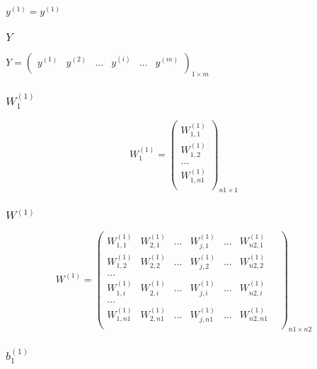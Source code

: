 \documentclass[
]{article}
\begin{document}
\(y^{(1)}={y^{(1)}}\)

\hypertarget{header-n9}{%
\subsubsection{\texorpdfstring{\(Y\)}{Y}}\label{header-n9}}

\(Y={
    \begin{pmatrix}
      y^{(1)} & y^{(2)} &...& y^{(i)} &...& y^{(m)} \\
    \end{pmatrix}
  }_{1×m}\)

\hypertarget{header-n11}{%
\subsubsection{\texorpdfstring{\(W^{(1)}_{1}\)}{W\^{}\{(1)\}\_\{1\}}}\label{header-n11}}

\[W^{(1)}_{1} = {
    \begin{pmatrix}
     W^{(1)}_{1,1} \\
     W^{(1)}_{1,2} \\
     ...\\
     W^{(1)}_{1,n1} \\
    \end{pmatrix}
  }_{n1×1}\]

\hypertarget{header-n13}{%
\subsubsection{\texorpdfstring{\(W^{(1)}\)}{W\^{}\{(1)\}}}\label{header-n13}}

\[W^{(1)} = {
    \begin{pmatrix}
      W^{(1)}_{1,1} & W^{(1)}_{2,1} & ... & W^{(1)}_{j,1} &...& W^{(1)}_{n2,1} &  \\
      W^{(1)}_{1,2} & W^{(1)}_{2,2} & ... & W^{(1)}_{j,2} &...& W^{(1)}_{n2,2} &  \\
      ...\\
      W^{(1)}_{1,i} & W^{(1)}_{2,i} & ... & W^{(1)}_{j,i} &...& W^{(1)}_{n2,i} &  \\
      ...\\
      W^{(1)}_{1,n1} & W^{(1)}_{2,n1} & ... & W^{(1)}_{j,n1} &...& W^{(1)}_{n2,n1} &  \\
    \end{pmatrix}
  }_{n1×n2}\]

\hypertarget{header-n15}{%
\subsubsection{\texorpdfstring{\(b^{(1)}_{1}\)}{b\^{}\{(1)\}\_\{1\}}}\label{header-n15}}
\end{document}
